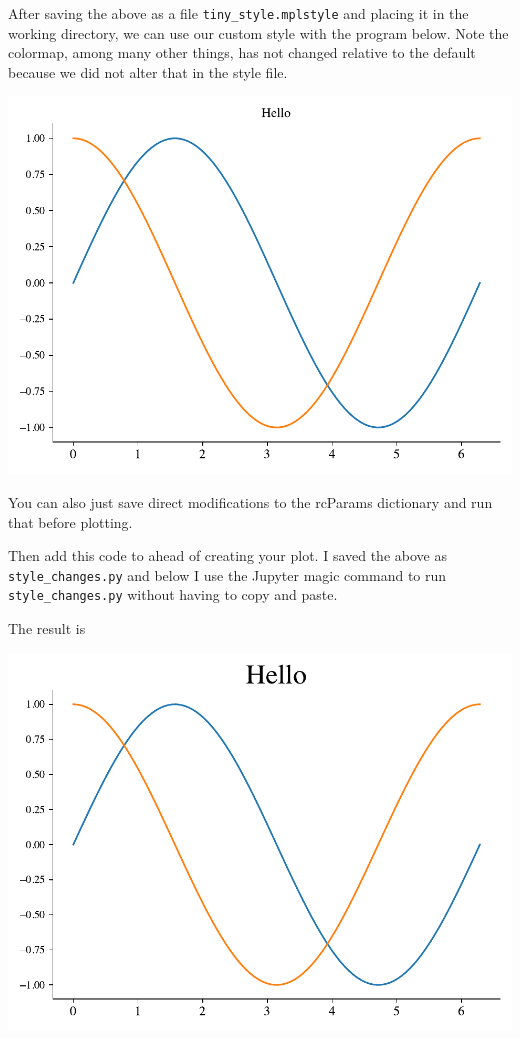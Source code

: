 
After saving the above as a file \texttt{tiny\_style.mplstyle} and placing it in the working directory, we can use our custom style with the program below. Note the colormap, among many other things, has not changed relative to the default because we did not alter that in the style file. 


\begin{center}
    \includegraphics[width = .7\textwidth]{figures/proseplots/tiny-style-ex.pdf}
\end{center}

You can also just save direct modifications to the rcParams dictionary and run that before plotting. 



Then add this code to ahead of creating your plot. I saved the above as \texttt{style\_changes.py} and below I use the Jupyter  magic command to run \texttt{style\_changes.py} without having to copy and paste. 



The result is 

\begin{center}
    \includegraphics[width = .7\textwidth]{figures/proseplots/py-styled.pdf}
\end{center}

